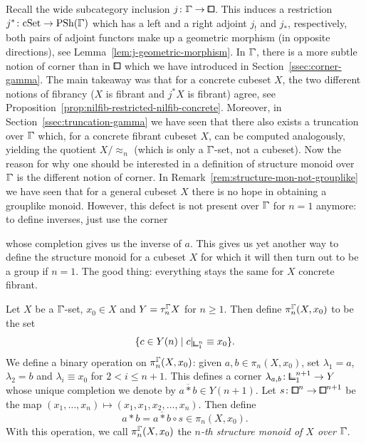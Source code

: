 Recall the wide subcategory inclusion $j\colon\bbGamma\to\bbox$.
This induces a restriction $j^\ast\colon\cSet\to\PSh(\bbGamma)$ which has a left and a right adjoint $j_!$ and $j_\ast$, respectively,
both pairs of adjoint functors make up a geometric morphism (in opposite directions), see Lemma~\ref{lem:j-geometric-morphism}.
In $\bbGamma$, there is a more subtle notion of corner than in $\bbox$ which we have introduced in Section~\ref{ssec:corner-gamma}.
The main takeaway was that for a concrete cubeset $X$, the two different notions of fibrancy ($X$ is fibrant and $j^\ast X$ is fibrant) agree, see Proposition~\ref{prop:nilfib-restricted-nilfib-concrete}.
Moreover, in Section~\ref{ssec:truncation-gamma} we have seen that there also exists a truncation over $\bbGamma$ which, for a concrete fibrant cubeset $X$, can be computed analogously,
yielding the quotient $X/\approx_n$ (which is only a $\bbGamma$-set, not a cubeset).
Now the reason for why one should be interested in a definition of structure monoid over $\bbGamma$ is the different notion of corner.
In Remark~\ref{rem:structure-mon-not-grouplike} we have seen that for a general cubeset $X$ there is no hope in obtaining a grouplike monoid.
However, this defect is not present over $\bbGamma$ for $n=1$ anymore: to define inverses, just use the corner
\begin{center}
\end{center}
whose completion gives us the inverse of $a$.
This gives us yet another way to define the structure monoid for a cubeset $X$
for which it will then turn out to be a group if $n=1$.
The good thing: everything stays the same for $X$ concrete fibrant.

\begin{definition}
Let $X$ be a $\bbGamma$-set, $x_0\in X$ and $Y = \tau_n^{\bbGamma} X$ for $n\geq 1$.
Then define $\pi_n^{\bbGamma}(X,x_0)$ to be the set
\[
    \{ c\in Y(n) \mid c\rvert_{{\bbcor}^n_1}\equiv x_0 \}.
\]
We define a binary operation on $\pi_n^{\bbGamma}(X,x_0)$:
given $a,b\in\pi_n(X,x_0)$, set $\lambda_1 = a$, $\lambda_2 = b$ and $\lambda_i \equiv x_0$ for $2<i\leq n+1$.
This defines a corner $\lambda_{a,b}\colon{\bbcor}^{n+1}_1\to Y$ whose unique completion we denote by $\overline{a*b}\in Y(n+1)$.
Let $s\colon{\bbox}^n\to{\bbox}^{n+1}$ be the map $(x_1,\ldots,x_n)\mapsto (x_1,x_1,x_2, \ldots,x_n)$.
Then define
\[
    a * b = \overline{a*b}\circ s \in \pi_n(X,x_0).
\]
With this operation, we call $\pi_n^{\bbGamma}(X,x_0)$ the \emph{$n$-th structure monoid of $X$ over $\bbGamma$}.
\end{definition}

